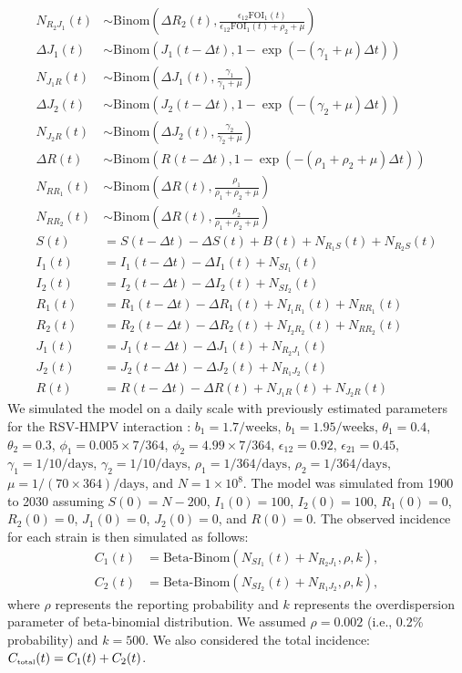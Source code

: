 \documentclass[12pt]{article}
\newcommand{\tsub}[2]{#1_{{\textrm{\tiny #2}}}}
\begin{document}
\begin{align}
N_{R_2J_1}(t) &\sim \mathrm{Binom}\left(\Delta R_2(t), \frac{\epsilon_{12} \textrm{FOI}_1(t)}{\epsilon_{12} \textrm{FOI}_1(t) + \rho_2 + \mu} \right)\\
\Delta J_1(t) &\sim \mathrm{Binom}\left(J_1(t-\Delta t), 1- \exp(-(\gamma_1 + \mu) \Delta t )\right) \\
N_{J_1R}(t) &\sim \mathrm{Binom}\left(\Delta J_1(t), \frac{\gamma_1}{\gamma_1 + \mu} \right)\\
\Delta J_2(t) &\sim \mathrm{Binom}\left(J_2(t-\Delta t), 1- \exp(-(\gamma_2 + \mu) \Delta t )\right) \\
N_{J_2R}(t) &\sim \mathrm{Binom}\left(\Delta J_2(t), \frac{\gamma_2}{\gamma_2 + \mu} \right)\\
\Delta R(t) &\sim \mathrm{Binom}\left(R(t-\Delta t), 1- \exp(-(\rho_1 + \rho_2 + \mu) \Delta t )\right) \\
N_{RR_1}(t) &\sim \mathrm{Binom}\left(\Delta R(t), \frac{\rho_1}{\rho_1 + \rho_2 + \mu} \right)\\
N_{RR_2}(t) &\sim \mathrm{Binom}\left(\Delta R(t), \frac{\rho_2}{\rho_1 + \rho_2 + \mu} \right)\\
S(t) &= S(t-\Delta t) - \Delta S(t) + B(t) + N_{R_1S}(t) + N_{R_2S}(t)\\
I_1(t) &= I_1(t-\Delta t) - \Delta I_1(t) + N_{SI_1}(t) \\
I_2(t) &= I_2(t-\Delta t) - \Delta I_2(t) + N_{SI_2}(t) \\
R_1(t) &= R_1(t-\Delta t) - \Delta R_1(t) + N_{I_1R_1}(t) + N_{RR_1}(t)\\
R_2(t) &= R_2(t-\Delta t) - \Delta R_2(t) + N_{I_2R_2}(t) + N_{RR_2}(t)\\
J_1(t) &= J_1(t-\Delta t) - \Delta J_1(t) + N_{R_2J_1}(t) \\
J_2(t) &= J_2(t-\Delta t) - \Delta J_2(t) + N_{R_1J_2}(t) \\
R(t) &= R(t-\Delta t) - \Delta R(t) + N_{J_1 R}(t) + N_{J_2 R}(t) 
\end{align}
We simulated the model on a daily scale with previously estimated parameters for the RSV-HMPV interaction \citep{bhattacharyya2015cross}:
$b_1=1.7/\mathrm{weeks}$, $b_1=1.95/\mathrm{weeks}$, $\theta_1 = 0.4$, $\theta_2 = 0.3$, $\phi_1=0.005 \times 7/364$, $\phi_2=4.99 \times 7/364$, $\epsilon_{12}=0.92$, $\epsilon_{21}=0.45$, $\gamma_1=1/10/\mathrm{days}$, $\gamma_2=1/10/\mathrm{days}$, $\rho_1=1/364/\mathrm{days}$, $\rho_2=1/364/\mathrm{days}$, $\mu=1/(70\times 364)/\mathrm{days}$, and $N = 1 \times 10^8$.
The model was simulated from 1900 to 2030 assuming $S(0) = N - 200$, $I_1(0) = 100$, $I_2(0) = 100$, $R_1(0) = 0$, $R_2(0) = 0$, $J_1(0) = 0$, $J_2(0) = 0$, and $R(0) = 0$.
The observed incidence for each strain is then simulated as follows:
\begin{align}
C_1(t) &= \textrm{Beta-Binom}(N_{SI_1}(t) + N_{R_2J_1}, \rho, k),\\ 
C_2(t) &= \textrm{Beta-Binom}(N_{SI_2}(t) + N_{R_1J_2}, \rho, k),
\end{align}
where $\rho$ represents the reporting probability and $k$ represents the overdispersion parameter of beta-binomial distribution.
We assumed $\rho = 0.002$ (i.e., 0.2\% probability) and $k = 500$.
We also considered the total incidence: $\tsub{C}{total}(t) = C_1(t) + C_2(t)$.
\end{document}
